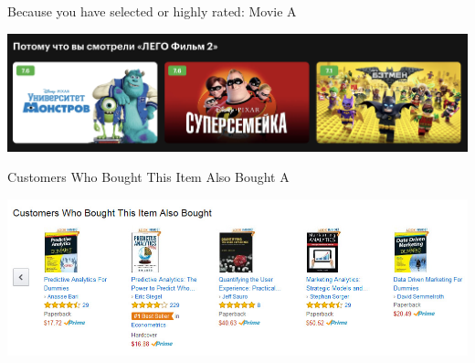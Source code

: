 \documentclass[11pt,aspectratio=169]{beamer}
\begin{document}
\begin{frame}

\begin{tcolorbox}[colback=info!5,colframe=info!80,title=Case-based]
Because you have selected or highly rated: Movie A
\end{tcolorbox}

\vfill

\begin{center}
\includegraphics[scale=0.3]{images/netflix.png}
\end{center}

\end{frame}

\begin{frame}

\begin{tcolorbox}[colback=info!5,colframe=info!80,title=Collaborative]
Customers Who Bought This Item Also Bought A
\end{tcolorbox}

\vfill

\begin{center}
\includegraphics[scale=0.3]{images/amazon.jpeg}
\end{center}

\end{frame}
\end{document}
